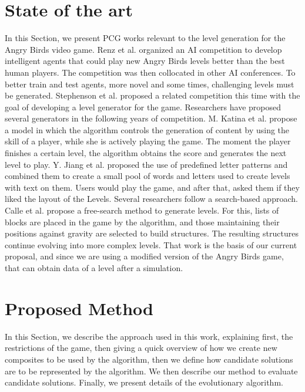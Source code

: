 \documentclass[conference]{IEEEtran}
\begin{document}
\section{State of the art}
\label{SoA}
In this Section, we present PCG works relevant to the level generation for
the Angry Birds video game. Renz et al. \cite{Renz, Renz2015TheAB} organized
an AI competition to develop intelligent agents that could play new  Angry
Birds levels better than the best human players. The competition was then
collocated in other AI conferences. To better train and test agents, more
novel and some times, challenging levels must be generated. Stephenson et
al. proposed a related competition this time with the goal of developing a
level generator for the game. Researchers have proposed several generators
in the following years of competition. M. Katina et al.  \cite{Kaidan2015}
propose a model in which the algorithm controls the generation of content by
using the skill of a player, while she is actively playing the game. The
moment the player finishes a certain level, the algorithm obtains the score
and generates the next level to play. Y. Jiang et al. \cite{Jiang2017}
proposed the use of predefined letter patterns and combined them to create a
small pool of words and letters used to create levels with text on them.
Users would play the game, and after that,   asked them if they liked the
layout of the Levels.  Several researchers follow a search-based approach.
Calle et al. \cite{lauracalle} propose a free-search method to generate
levels.  For this, lists of blocks are placed in the game by the algorithm,
and those maintaining their positions against gravity are selected to build
structures. The resulting structures continue evolving into more complex
levels. That work is the basis of our current proposal, and since we are
using a modified version of the Angry Birds game, that can obtain data of a
level after a simulation.
    
    \section{Proposed Method}
    \label{prop_method}  
    In this Section, we describe the approach used in this work, explaining
first, the restrictions of the game, then giving a quick overview of how we
create new composites to be used by the algorithm, then we define how candidate
solutions are to be represented by the algorithm. We then describe our method to
evaluate candidate solutions. Finally, we present details of the evolutionary
algorithm. 
\end{document}
